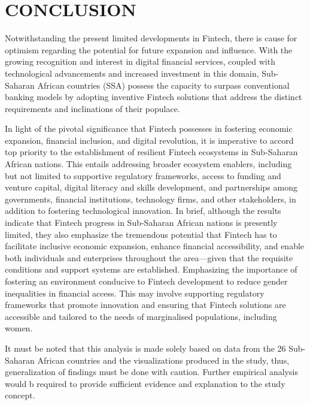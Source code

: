 \documentclass[preprint, 3p,
authoryear]{elsarticle} %
\begin{document}
\hypertarget{conclusion}{%
\section{CONCLUSION}\label{conclusion}}

Notwithstanding the present limited developments in Fintech, there is
cause for optimism regarding the potential for future expansion and
influence. With the growing recognition and interest in digital
financial services, coupled with technological advancements and
increased investment in this domain, Sub-Saharan African countries (SSA)
possess the capacity to surpass conventional banking models by adopting
inventive Fintech solutions that address the distinct requirements and
inclinations of their populace.

In light of the pivotal significance that Fintech possesses in fostering
economic expansion, financial inclusion, and digital revolution, it is
imperative to accord top priority to the establishment of resilient
Fintech ecosystems in Sub-Saharan African nations. This entails
addressing broader ecosystem enablers, including but not limited to
supportive regulatory frameworks, access to funding and venture capital,
digital literacy and skills development, and partnerships among
governments, financial institutions, technology firms, and other
stakeholders, in addition to fostering technological innovation. In
brief, although the results indicate that Fintech progress in
Sub-Saharan African nations is presently limited, they also emphasize
the tremendous potential that Fintech has to facilitate inclusive
economic expansion, enhance financial accessibility, and enable both
individuals and enterprises throughout the area---given that the
requisite conditions and support systems are established. Emphasizing
the importance of fostering an environment conducive to Fintech
development to reduce gender inequalities in financial access. This may
involve supporting regulatory frameworks that promote innovation and
ensuring that Fintech solutions are accessible and tailored to the needs
of marginalised populations, including women.

It must be noted that this analysis is made solely based on data from
the 26 Sub-Saharan African countries and the visualizations produced in
the study, thus, generalization of findings must be done with caution.
Further empirical analysis would b required to provide sufficient
evidence and explanation to the study concept.


\end{document}
